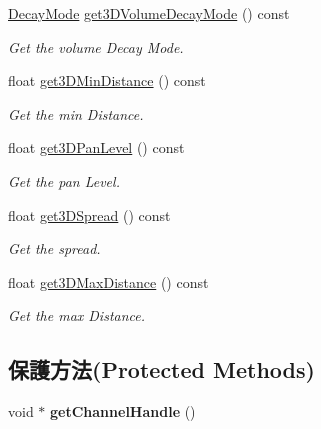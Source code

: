 \begin{DoxyCompactItemize}
\hyperlink{class_i_dream_sky_1_1_audio_source_base_a037f40be30e9c7a8788f3caefe38e252}{Decay\+Mode} \hyperlink{class_i_dream_sky_1_1_audio_source_base_af391e91a553bed39946da51541652b57}{get3\+D\+Volume\+Decay\+Mode} () const 
\begin{DoxyCompactList}\small\item\em Get the volume Decay Mode. \end{DoxyCompactList}\item 
float \hyperlink{class_i_dream_sky_1_1_audio_source_base_a873f65d66feee4c6a815f55ebbc7b7c9}{get3\+D\+Min\+Distance} () const 
\begin{DoxyCompactList}\small\item\em Get the min Distance. \end{DoxyCompactList}\item 
float \hyperlink{class_i_dream_sky_1_1_audio_source_base_a5b1fadd8c7e23e796e048d18a689e0ec}{get3\+D\+Pan\+Level} () const 
\begin{DoxyCompactList}\small\item\em Get the pan Level. \end{DoxyCompactList}\item 
float \hyperlink{class_i_dream_sky_1_1_audio_source_base_a63a43e00bad4fcc571fc76d59c9b337a}{get3\+D\+Spread} () const 
\begin{DoxyCompactList}\small\item\em Get the spread. \end{DoxyCompactList}\item 
float \hyperlink{class_i_dream_sky_1_1_audio_source_base_aa6d27b8b1ba879ba722719b1c6ea5eca}{get3\+D\+Max\+Distance} () const 
\begin{DoxyCompactList}\small\item\em Get the max Distance. \end{DoxyCompactList}\end{DoxyCompactItemize}
\subsection*{保護方法(Protected Methods)}
\begin{DoxyCompactItemize}
\item 
void $\ast$ {\bfseries get\+Channel\+Handle} ()\hypertarget{class_i_dream_sky_1_1_audio_source_base_a4354d0b3dbd51c1e934bbae6f5d1fecd}{}\label{class_i_dream_sky_1_1_audio_source_base_a4354d0b3dbd51c1e934bbae6f5d1fecd}

\end{DoxyCompactItemize}
